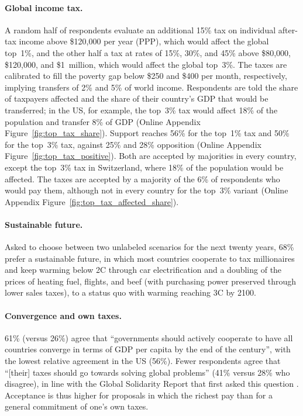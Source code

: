 \documentclass[12pt,english]{article}
\begin{document}
\paragraph{Global income tax.}\label{par:global_income_redistr} A random half of respondents evaluate an additional 15\% tax on individual after-tax income above \$120,000 per year (PPP), which would affect the global top~1\%, and the other half a tax at rates of 15\%, 30\%, and 45\% above \$80,000, \$120,000, and \$1~million, which would affect the global top~3\%. The taxes are calibrated to fill the poverty gap below \$250 and \$400 per month, respectively, implying transfers of 2\% and 5\% of world income. Respondents are told the share of taxpayers affected and the share of their country's GDP that would be transferred; in the US, for example, the top~3\% tax would affect 18\% of the population and transfer 8\% of GDP (Online Appendix Figure~\ref{fig:top_tax_share}). Support reaches 56\% for the top~1\% tax and 50\% for the top~3\% tax, against 25\% and 28\% opposition (Online Appendix Figure~\ref{fig:top_tax_positive}). Both are accepted by majorities in every country, except the top~3\% tax in Switzerland, where 18\% of the population would be affected. The taxes are accepted by a majority of the 6\% of respondents who would pay them, although not in every country for the top~3\% variant (Online Appendix Figure~\ref{fig:top_tax_affected_share}).

\paragraph{Sustainable future.}\label{par:sustainable_future} Asked to choose between two unlabeled scenarios for the next twenty years, 68\% prefer a sustainable future, in which most countries cooperate to tax millionaires and keep warming below 2\textdegree{}C through car electrification and a doubling of the prices of heating fuel, flights, and beef (with purchasing power preserved through lower sales taxes), to a status quo with warming reaching 3\textdegree{}C by 2100.

\paragraph{Convergence and own taxes.}\label{par:convergence}\label{par:my_tax} 61\% (versus 26\%) agree that ``governments should actively cooperate to have all countries converge in terms of GDP per capita by the end of the century'', with the lowest relative agreement in the US (56\%). Fewer respondents agree that ``[their] taxes should go towards solving global problems'' (41\% versus 28\% who disagree), in line with the Global Solidarity Report that first asked this question \citep{global_nation_global_2023}. Acceptance is thus higher for proposals in which the richest pay than for a general commitment of one's own taxes.
\end{document}
